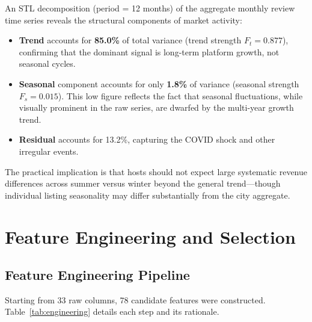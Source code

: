 \documentclass[12pt, a4paper]{article}
\begin{document}
An STL decomposition (period = 12 months) of the aggregate monthly review time series reveals the structural components of market activity:
\begin{itemize}[itemsep=2pt]
  \item \textbf{Trend} accounts for \textbf{85.0\%} of total variance (trend strength $F_t = 0.877$), confirming that the dominant signal is long-term platform growth, not seasonal cycles.
  \item \textbf{Seasonal} component accounts for only \textbf{1.8\%} of variance (seasonal strength $F_s = 0.015$). This low figure reflects the fact that seasonal fluctuations, while visually prominent in the raw series, are dwarfed by the multi-year growth trend.
  \item \textbf{Residual} accounts for 13.2\%, capturing the COVID shock and other irregular events.
\end{itemize}

The practical implication is that hosts should not expect large systematic revenue differences across summer versus winter beyond the general trend---though individual listing seasonality may differ substantially from the city aggregate.

\section{Feature Engineering and Selection}
\label{sec:features}

\subsection{Feature Engineering Pipeline}

Starting from 33 raw columns, 78 candidate features were constructed. Table~\ref{tab:engineering} details each step and its rationale.
\end{document}
